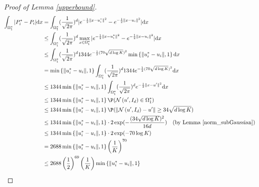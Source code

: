 \begin{proof}[Proof of Lemma \ref{upperbound}]
\begin{align}
\int_{\Omega_{1}^{*}} |P_{i}^{*}-P_{i}| \mathrm{d}x &= \int_{\Omega_{1}^{*}} (\frac{1}{\sqrt{2\pi}})^{d} | e^{-\frac{1}{2}\|x-u_{i}^{*}\|^{2}} - e^{-\frac{1}{2}\|x-u_{i}\|^{2}}  | \mathrm{d}x \notag\\
&\leq \int_{\Omega_{1}^{*}} (\frac{1}{\sqrt{2\pi}})^{d} \max_{x\in \Omega_{1}^{*}} | e^{-\frac{1}{2}\|x-u_{i}^{*}\|^{2}} - e^{-\frac{1}{2}\|x-u_{i}\|^{2}}  | \mathrm{d}x \notag\\
&\leq \int_{\Omega_{1}^{*}} (\frac{1}{\sqrt{2\pi}})^{d} 1344 e ^{-\frac{1}{2} (70\sqrt{d \log{K}})^{2}} \min \left\{ \|u_{i}^{*}-u_{i}\|, 1 \right\} \mathrm{d}x\notag\\
& = \min \left\{ \|u_{i}^{*}-u_{i}\|, 1 \right\} \int_{\Omega_{1}^{*}} (\frac{1}{\sqrt{2\pi}})^{d} 1344 e ^{-\frac{1}{2} (70\sqrt{d \log{K}})^{2}}  \mathrm{d}x \notag\\
& \leq 1344 \min \left\{ \|u_{i}^{*}-u_{i}\|, 1 \right\} \int_{\Omega_{1}^{*}} (\frac{1}{\sqrt{2\pi}})^{d} e^{-\frac{1}{2}\|x-u'\|^{2}}\mathrm{d}x \notag\\
& \leq 1344 \min \left\{ \|u_{i}^{*}-u_{i}\|, 1 \right\} \P (\mathcal{N}\left(u', I_d\right)\in \Omega_{1}^{*}) \notag\\
& \leq 1344 \min \left\{ \|u_{i}^{*}-u_{i}\|, 1 \right\} \P (\|\mathcal{N}\left(u', I_d\right)-u'\| \geq 34\sqrt{d \log K}) \notag\\
& \leq 1344 \min \left\{ \|u_{i}^{*}-u_{i}\|, 1 \right\} \cdot 2\exp(-\frac{(34\sqrt{d \log K})^{2}}{16d})\quad\text{(by Lemma \ref{norm_subGaussian})} \notag\\
&\leq 1344 \min \left\{ \|u_{i}^{*}-u_{i}\|, 1 \right\} \cdot 2\exp(-70\log K)\notag\\
&= 2688 \min \left\{ \|u_{i}^{*}-u_{i}\|, 1 \right\} \left(\frac{1}{K}\right)^{70} \notag\\
&\leq 2688 \left(\frac{1}{2}\right)^{69} \left(\frac{1}{K}\right) \min \left\{ \|u_{i}^{*}-u_{i}\|, 1 \right\}
\end{align}

\end{proof}